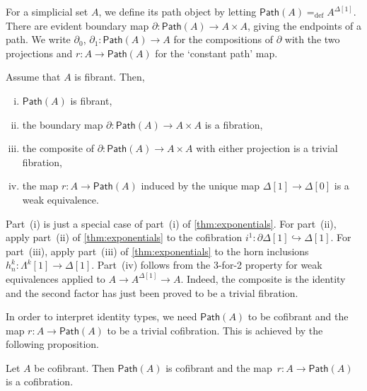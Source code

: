 \documentclass[reqno,10pt,a4paper,oneside,draft]{amsart}
\makeatletter
\renewenvironment{proof}[1][\proofname] {\par\pushQED{\qed}\normalfont\topsep6\p@\@plus6\p@\relax\trivlist\item[\hskip\labelsep\bf#1\@addpunct{.}]\ignorespaces}{\popQED\endtrivlist\@endpefalse}
\numberwithin{equation}{section}
\theoremstyle{mythm}
\theoremstyle{mydef}
\theoremstyle{myrmk}
\newcommand{\defeq}{=_{\operatorname{def}}}
\newcommand{\co}{\colon}
\newcommand{\Path}{\mathsf{Path}}
\makeatother
\begin{document}
For a simplicial set $A$, we define its path object by letting $\Path(A) \defeq A^{\Delta[1]}$. 
There are evident boundary map $\partial \co \Path(A) \to A \times A$, giving
the endpoints of a path. We write $\partial_0$, $\partial_1 \co \Path(A) \to A$ for the compositions of $\partial$
with the two projections and $r \co A \to \Path(A)$ for the `constant path' map.



\begin{proposition} \label{thm:id-types-for-types}
Assume that $A$ is fibrant. Then,
\begin{enumerate}[(i)] 
\item $\Path(A)$ is fibrant,
\item the boundary map $\partial  \co \Path(A) \rightarrow A \times A$ is a fibration,
\item the composite of $\partial \co \Path(A) \rightarrow A \times A$ with either projection is a trivial fibration,
\item the map $r \co A \rightarrow \Path(A)$ induced by the unique map $\Delta[1] \rightarrow \Delta[0]$ is a weak equivalence.
\end{enumerate}
\end{proposition} 

\begin{proof}
Part~(i) is just a special case of part~(i) of \cref{thm:exponentials}. For part~(ii), apply part~(ii) of \cref{thm:exponentials} to the cofibration $i^1 \co \partial \Delta[1]  \hookrightarrow \Delta[1]$. For part~(iii), apply part~(iii) of \cref{thm:exponentials} to the horn inclusions $h^k_n \co \Lambda^k[1]  \rightarrow \Delta[1]$. Part~(iv) follows from the 3-for-2 property for weak equivalences applied to $A \rightarrow A^{\Delta[1]} \rightarrow A$. Indeed, the
composite is the identity and the second factor has just been proved to be a trivial fibration.
\end{proof}


In order to interpret identity types, we need $\Path(A)$ to be cofibrant and the map $r \co A \rightarrow \Path(A)$ to be a trivial cofibration. This is achieved by the following proposition.

\begin{proposition}\label{proposition:PathObjectCofibrant}
Let $A$ be cofibrant. Then $\Path(A)$ is cofibrant and the map~$r \co A \rightarrow \Path(A)$ is a cofibration.
\end{proposition}
\end{document}
